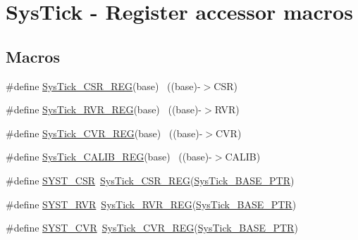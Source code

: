\hypertarget{group___sys_tick___register___accessor___macros}{}\section{Sys\+Tick -\/ Register accessor macros}
\label{group___sys_tick___register___accessor___macros}
\subsection*{Macros}
\begin{DoxyCompactItemize}
\item 
\#define \hyperlink{group___sys_tick___register___accessor___macros_ga07f2beb63f7b50b9e1fa8b383d9ca87c}{Sys\+Tick\+\_\+\+C\+S\+R\+\_\+\+R\+EG}(base)                                    ~((base)-\/$>$C\+SR)
\item 
\#define \hyperlink{group___sys_tick___register___accessor___macros_gae6985161bde8ca82ac983a2d43839595}{Sys\+Tick\+\_\+\+R\+V\+R\+\_\+\+R\+EG}(base)                                    ~((base)-\/$>$R\+VR)
\item 
\#define \hyperlink{group___sys_tick___register___accessor___macros_ga12164c6b1ad1c5e5d5cac7129940d0bf}{Sys\+Tick\+\_\+\+C\+V\+R\+\_\+\+R\+EG}(base)                                    ~((base)-\/$>$C\+VR)
\item 
\#define \hyperlink{group___sys_tick___register___accessor___macros_gab41be68de8d2d31d938d419f9feb900f}{Sys\+Tick\+\_\+\+C\+A\+L\+I\+B\+\_\+\+R\+EG}(base)                                ~((base)-\/$>$C\+A\+L\+IB)
\item 
\#define \hyperlink{group___sys_tick___register___accessor___macros_gab26b3fc75982181f81b185b206e897f6}{S\+Y\+S\+T\+\_\+\+C\+SR}~\hyperlink{group___sys_tick___register___accessor___macros_ga07f2beb63f7b50b9e1fa8b383d9ca87c}{Sys\+Tick\+\_\+\+C\+S\+R\+\_\+\+R\+EG}(\hyperlink{group___sys_tick___peripheral_gaeef73642fdef722ce658e468dad877ea}{Sys\+Tick\+\_\+\+B\+A\+S\+E\+\_\+\+P\+TR})
\item 
\#define \hyperlink{group___sys_tick___register___accessor___macros_ga4e8efcc1f2b551dbf3cb0aae1231e380}{S\+Y\+S\+T\+\_\+\+R\+VR}~\hyperlink{group___sys_tick___register___accessor___macros_gae6985161bde8ca82ac983a2d43839595}{Sys\+Tick\+\_\+\+R\+V\+R\+\_\+\+R\+EG}(\hyperlink{group___sys_tick___peripheral_gaeef73642fdef722ce658e468dad877ea}{Sys\+Tick\+\_\+\+B\+A\+S\+E\+\_\+\+P\+TR})
\item 
\#define \hyperlink{group___sys_tick___register___accessor___macros_gae3dc4d2dbfdf38c593a5581415fecfed}{S\+Y\+S\+T\+\_\+\+C\+VR}~\hyperlink{group___sys_tick___register___accessor___macros_ga12164c6b1ad1c5e5d5cac7129940d0bf}{Sys\+Tick\+\_\+\+C\+V\+R\+\_\+\+R\+EG}(\hyperlink{group___sys_tick___peripheral_gaeef73642fdef722ce658e468dad877ea}{Sys\+Tick\+\_\+\+B\+A\+S\+E\+\_\+\+P\+TR})

\end{DoxyCompactItemize}
